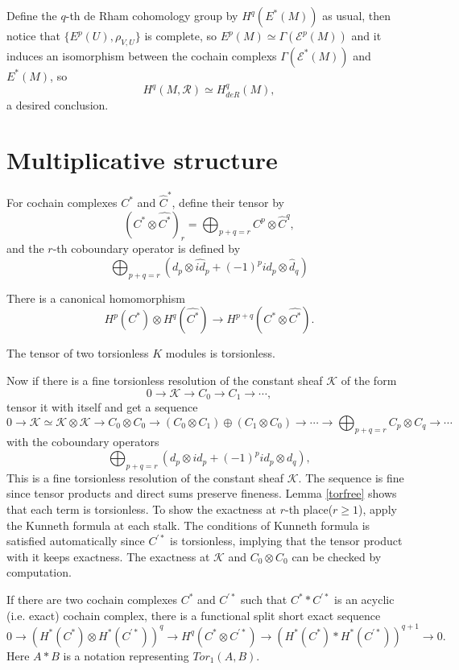 \documentclass[twoside]{article}
\begin{document}
 Define the $q$-th de Rham cohomology group by $H^q(E^*(M))$ as usual,
 then notice that $\{E^p(U),\rho_{V,U}\}$ is complete, so $E^p(M)\simeq \Gamma(\mathscr{E}^p(M))$ and it induces an isomorphism  between the cochain complexs  $\Gamma(\mathscr{E}^*(M))$ and $E^*(M)$, so  $$
 H^q(M,\mathscr{R})\simeq H^q_{deR}(M),
 $$
a desired conclusion.

\section{Multiplicative structure}
\begin{definition}
  For cochain complexes $C^*$ and $\hat{C}^*$,  define their tensor by $$
  (C^*\otimes \hat{C^*})_r=\bigoplus_{p+q=r}C^p\otimes \hat{C}^q,
  $$
  and the $r$-th coboundary operator is defined by 
  $$
  \bigoplus_{p+q=r}(d_p\otimes \hat{id}_p+(-1)^p{id}_p\otimes \hat{d}_q)
  $$
\end{definition}
There is  a canonical homomorphism $$
H^p(C^*)\otimes H^q(\hat{C^*})\to H^{p+q}(C^*\otimes \hat{C^*}).
$$

\begin{lemma}\label{torfree}
  The tensor of two torsionless $K$ modules is torsionless.
\end{lemma}

Now if there is a fine torsionless resolution of the constant sheaf $\mathscr{K}$ of the form
$$
0\to \mathscr{K}\to C_0\to C_1\to\cdots,
$$
 tensor it with itself and get a sequence $$
0\to \mathscr{K}\simeq \mathscr{K}\otimes \mathscr{K}\to C_0\otimes C_0\to (C_0\otimes C_1)\oplus (C_1\otimes C_0)\to \cdots \to \bigoplus_{p+q=r}C_p\otimes C_q\to \cdots
$$
with the coboundary operators $$
  \bigoplus_{p+q=r}(d_p\otimes {id}_p+(-1)^p{id}_p\otimes d_q),
  $$
This is a fine torsionless resolution of the constant sheaf $\mathscr{K}$. The sequence is fine since  tensor products and direct sums preserve fineness. Lemma \ref{torfree} shows that each term is torsionless. To show the exactness at $r$-th place($r\geq 1 $),  apply the Kunneth formula at each stalk. The conditions of Kunneth formula is satisfied automatically since $C^{\prime*}$ is torsionless, implying that the tensor product with it keeps exactness. The exactness at $\mathscr{K}$ and $C_0\otimes C_0$ can be  checked by computation.

\begin{theorem}
If there are two cochain complexes $C^*$ and $C^{\prime *}$ such that $C^**C^{\prime *}$ is an acyclic (i.e. exact) cochain complex, there is a functional split short exact sequence $$
0\to (H^*(C^*)\otimes H^*(C^{\prime *}))^q\to H^q(C^*\otimes C^{\prime *})\to ( H^*(C^*)*H^*(C^{\prime *})  )^{q+1}\to 0.
$$
Here $A*B$ is a notation representing $Tor_1(A,B)$.
\end{theorem}
\end{document}
